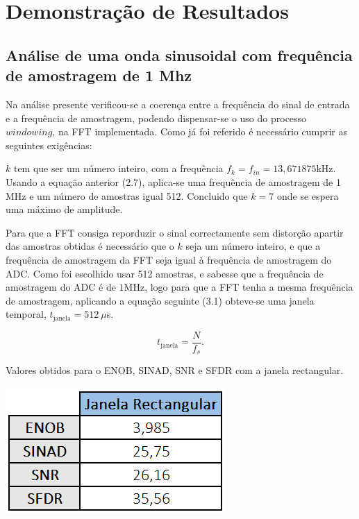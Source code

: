 \documentclass[11pt]{article}
\numberwithin{equation}{section}
\begin{document}
\section{Demonstração de Resultados}

\subsection{Análise de uma onda sinusoidal com frequência de amostragem de 1 Mhz}

Na análise presente verificou-se a coerença entre a frequência do sinal de entrada e a frequência de amostragem, podendo dispensar-se o uso do processo $windowing$, na FFT implementada.
Como já foi referido é necessário cumprir as seguintes exigências:
	
$k$ tem que ser um número inteiro, com a frequência $f_{k} = f_{in} = 13,671875$kHz. Usando a equação anterior (2.7), aplica-se uma frequência de amostragem de 1 MHz e um número de amostras igual 512. Concluido que $k = 7$ onde se espera uma máximo de amplitude.

Para que a FFT consiga reporduzir o sinal correctamente sem distorção apartir das amostras obtidas é necessário que o $k$ seja um número inteiro, e que a frequência de amostragem da FFT seja igual à frequência de amostragem do ADC. Como foi escolhido usar 512 amostras, e sabesse que a frequência de amostragem do ADC é de $1$MHz, logo para que a FFT tenha a mesma frequência de amostragem, aplicando a equação seguinte (3.1) obteve-se uma janela temporal, $t_{\text{janela}} = 512~\mu$s.

\vspace{-3mm}
\begin{equation}
 	t_{\text{janela}} = \frac{N}{f_{s}}.
 	\label{eq:temp_jan}
\end{equation}

\begin{table}[h]
	\centering
	\caption{Valores obtidos para o ENOB, SINAD, SNR e SFDR com a janela rectangular.}
 	\includegraphics[keepaspectratio=true, scale=0.50]{lab/rect.png}
\end{table}
\end{document}
